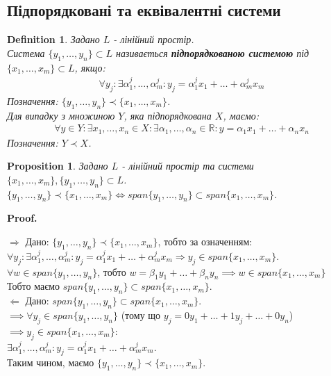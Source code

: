 \documentclass[a4paper, 10pt]{article}
\makeatletter
\def\rightproof{$\boxed{\Rightarrow}$ }
\def\leftproof{$\boxed{\Leftarrow}$ }
\theoremstyle{theoremdd}
\newtheorem{definition}[theorem]{Definition}
\newtheorem{proposition}[theorem]{Proposition}
\renewenvironment{proof}[1][Proof.\\]{\par
\pushQED{\hfill \qed}%
\normalfont \topsep6\p@\@plus6\p@\relax
\trivlist
\item\relax
{\bfseries
#1\@addpunct{.}}\hspace\labelsep\ignorespaces
}{%
\popQED\endtrivlist\@endpefalse
}
\makeatother
\begin{document}
	\subsection{Підпорядковані та еквівалентні системи}
	\begin{definition}
	Задано $L$ - лінійний простір.\\
	Система $\{y_1, \dots, y_n \} \subset L$ називається \textbf{підпорядкованою системою} під $\{x_1, \dots, x_m\} \subset L$, якщо:
	\begin{align*}
	\forall y_j: \exists \alpha^j_1, \dots, \alpha^j_m: y_j = \alpha^j_1 x_1 + \dots + \alpha^j_m x_m
	\end{align*}
	Позначення: $\{y_1, \dots, y_n \} \prec \{x_1, \dots, x_m \}$.\\
	Для випадку з множиною $Y$, яка підпорядкована $X$, маємо:
	\begin{align*}
	\forall y \in Y: \exists x_1,\dots,x_n \in X: \exists \alpha_1, \dots, \alpha_n \in \mathbb{R}: y = \alpha_1 x_1 + \dots + \alpha_n x_n
	\end{align*}
	Позначення: $Y \prec X$.
	\end{definition}
	
	\begin{proposition}
	\label{subordinate_prp1}
	Задано $L$ - лінійний простір та системи $\{x_1,\dots,x_m\}, \{y_1,\dots,y_n\} \subset L$.\\
	$\{y_1, \dots, y_n \} \prec \{x_1, \dots, x_m \} \iff span \{y_1, \dots, y_n\} \subset span \{x_1, \dots, x_m \}$.
	\end{proposition}
	
	\begin{proof}
	\rightproof Дано: $\{y_1, \dots, y_n \} \prec \{x_1, \dots, x_m \}$, тобто за означенням:\\
	$\forall y_j: \exists \alpha^j_1, \dots, \alpha^j_m: y_j = \alpha^j_1 x_1 + \dots + \alpha^j_m x_m \Rightarrow y_j \in span\{x_1, \dots, x_m\}$.\\
	$\forall w \in span\{y_1, \dots, y_n\}$, тобто $w = \beta_1 y_1 + \dots + \beta_n y_n \implies w \in span\{x_1, \dots, x_m\}$\\
	Тобто маємо $span \{y_1, \dots, y_n\} \subset span \{x_1, \dots, x_m \}$.
	\bigskip \\
	\leftproof Дано: $span \{y_1, \dots, y_n\} \subset span \{x_1, \dots, x_m \}$.\\
	$\implies \forall y_j \in span \{y_1, \dots, y_n \}$ \hspace{0.2cm}(тому що $y_j = 0y_1 + \dots + 1 y_j + \dots + 0 y_n$)\hspace{0.2cm} $\implies y_j \in span\{x_1,\dots,x_m\}$:\\
	$\exists \alpha^j_1, \dots, \alpha^j_m: y_j = \alpha^j_1 x_1 + \dots + \alpha^j_m x_m$.\\
	Таким чином, маємо $\{y_1, \dots, y_n \} \prec \{x_1, \dots, x_m \}$.
	\end{proof}
	
\end{document}
